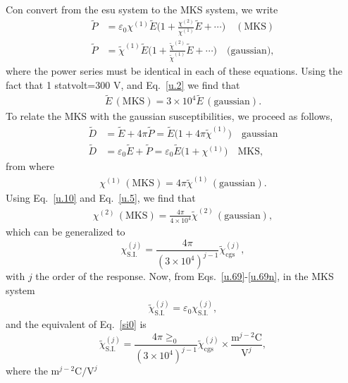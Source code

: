 \documentclass[12pt]{article}
\numberwithin{equation}{section}
\begin{document}
\begin{enumerate}
Con convert from the esu system to the MKS system, we write
\begin{align}\label{u.5}
\tilde P&=\varepsilon_0
\chi^{(1)}\tilde E\Big(1+\frac{\chi^{(2)}}{\chi^{(1)}}\tilde E+\cdots\Big) \quad(\text{MKS})
\nonumber\\
\tilde P&=\tilde\chi^{(1)}\tilde E\Big(1+\frac{\tilde\chi^{(2)}}{\tilde\chi^{(1)}}\tilde E+\cdots  \Big)\quad\text{(gaussian)}
,
\end{align} 
where the power series must be identical in each of these equations.
Using the fact that 1 statvolt=300 V, and Eq.~\eqref{u.2} we find that 
\begin{align}\label{u.10}
\tilde E\, (\text{MKS})=3\times 10^4\tilde E \,(\text{gaussian})
.
\end{align}
To relate the MKS with the gaussian susceptibilities, we proceed as
follows,
\begin{align}\label{u.11}
\tilde D &= \tilde E + 4\pi\tilde P 
=\tilde E\big(1+4\pi\tilde \chi^{(1)})\quad\text{gaussian}
\nonumber\\
\tilde D &= \varepsilon_0\tilde E + \tilde P 
=\varepsilon_0\tilde E\big(1+ \chi^{(1)})\quad\text{MKS}
,
\end{align}   
from where
\begin{align}\label{u.12}
\chi^{(1)}\,(\text{MKS})= 
4\pi\tilde \chi^{(1)}\,(\text{gaussian})  
.  
\end{align}   
Using Eq.~\eqref{u.10} and Eq.~\eqref{u.5}, we find that
\begin{align}\label{u.13}
\chi^{(2)}\,(\text{MKS})=
\frac{4\pi}{4\times 10^4}\tilde \chi^{(2)}\,(\text{gaussian}) 
, 
\end{align}  
which can be generalized to
\begin{equation}\label{si0}
\chi_{\mathrm{S.I.}}^{(j)}=\frac{4\pi}{(3\times 
 10^4)^{j-1}}\tilde\chi^{(j)}_{\mathrm{cgs}}
,
\end{equation} 
with $j$ the order of the response.  Now, from Eqs.~\eqref{u.69}-\eqref{u.69n}, in
the MKS system
\begin{align}\label{u.20}
\tilde\chi^{(j)}_{\text{S.I.}}=\varepsilon_0\chi^{(j)}_{\text{S.I.}}
,
\end{align}
and the equivalent of Eq.~\eqref{si0} is
\begin{equation}\label{si.2}
\tilde\chi_{\mathrm{S.I.}}^{(j)}=\frac{4\pi\ge_0}{(3\times 
 10^4)^{j-1}}\tilde\chi^{(j)}_{\mathrm{cgs}} \times 
\frac{\text{m}^{j-2}\text{C}}{\text{V}^j}
,
\end{equation}  
where the 
$\text{m}^{j-2}\text{C}/\text{V}^j$

\end{enumerate}
\end{document}
